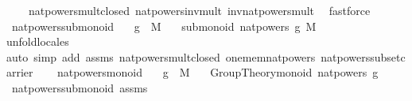 \begin{isabellebody}
\ \ \ \ nat{\isacharunderscore}{\kern0pt}powers{\isacharunderscore}{\kern0pt}mult{\isacharunderscore}{\kern0pt}closed\ nat{\isacharunderscore}{\kern0pt}powers{\isacharunderscore}{\kern0pt}inv{\isacharunderscore}{\kern0pt}mult\ inv{\isacharunderscore}{\kern0pt}nat{\isacharunderscore}{\kern0pt}powers{\isacharunderscore}{\kern0pt}mult\ \isamarkupfalse%
\ fastforce%
\endisatagproof
{\isafoldproof}%
%
\isadelimproof
\isanewline
%
\endisadelimproof
\isanewline
{}\isamarkupfalse%
\ nat{\isacharunderscore}{\kern0pt}powers{\isacharunderscore}{\kern0pt}submonoid{\isacharcolon}{\kern0pt}\isanewline
\ \ \ {\isachardoublequoteopen}g\ {\isasymin}\ M{\isachardoublequoteclose}\isanewline
\ \ \ {\isachardoublequoteopen}submonoid\ {\isacharparenleft}{\kern0pt}nat{\isacharunderscore}{\kern0pt}powers\ g{\isacharparenright}{\kern0pt}\ M\ {\isacharparenleft}{\kern0pt}{\isasymcdot}{\isacharparenright}{\kern0pt}\ {\isasymone}{\isachardoublequoteclose}\isanewline
%
\isadelimproof
\ \ %
\endisadelimproof
%
\isatagproof
{}\isamarkupfalse%
{\isacharparenleft}{\kern0pt}unfold{\isacharunderscore}{\kern0pt}locales{\isacharparenright}{\kern0pt}\isanewline
\ \ \isamarkupfalse%
{\isacharparenleft}{\kern0pt}auto\ simp\ add{\isacharcolon}{\kern0pt}\ assms\ nat{\isacharunderscore}{\kern0pt}powers{\isacharunderscore}{\kern0pt}mult{\isacharunderscore}{\kern0pt}closed\ one{\isacharunderscore}{\kern0pt}mem{\isacharunderscore}{\kern0pt}nat{\isacharunderscore}{\kern0pt}powers\ nat{\isacharunderscore}{\kern0pt}powers{\isacharunderscore}{\kern0pt}subset{\isacharunderscore}{\kern0pt}carrier{\isacharparenright}{\kern0pt}\isanewline
\ \ \isamarkupfalse%
%
\endisatagproof
{\isafoldproof}%
%
\isadelimproof
\isanewline
%
\endisadelimproof
\isanewline
{}\isamarkupfalse%
\ nat{\isacharunderscore}{\kern0pt}powers{\isacharunderscore}{\kern0pt}monoid{\isacharcolon}{\kern0pt}\isanewline
\ \ \ {\isachardoublequoteopen}g\ {\isasymin}\ M{\isachardoublequoteclose}\isanewline
\ \ \ {\isachardoublequoteopen}Group{\isacharunderscore}{\kern0pt}Theory{\isachardot}{\kern0pt}monoid\ {\isacharparenleft}{\kern0pt}nat{\isacharunderscore}{\kern0pt}powers\ g{\isacharparenright}{\kern0pt}\ {\isacharparenleft}{\kern0pt}{\isasymcdot}{\isacharparenright}{\kern0pt}\ {\isasymone}{\isachardoublequoteclose}\isanewline
%
\isadelimproof
\ \ %
\endisadelimproof
%
\isatagproof
{}\isamarkupfalse%
\ nat{\isacharunderscore}{\kern0pt}powers{\isacharunderscore}{\kern0pt}submonoid\ assms\ \isamarkupfalse%

\end{isabellebody}
